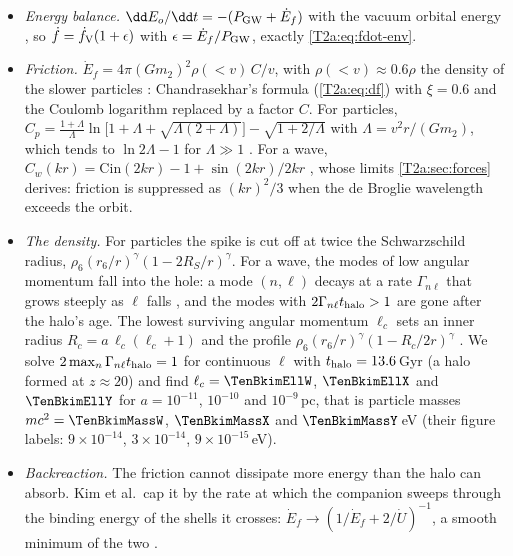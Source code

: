 \begin{itemize}[itemsep=2pt,leftmargin=1.2em]
  \item \emph{Energy balance.} $\dd E_o/\dd t=-(P_{\rm GW}+\dot E_f)$ with the vacuum orbital energy
        \cite[eq.~(36)]{Kim2023}, so $\dot f=\dot f_{\rm V}(1+\epsilon)$ with $\epsilon=\dot E_f/P_{\rm GW}$, exactly
        \cref{T2a:eq:fdot-env}.
  \item \emph{Friction.} $\dot E_f=4\pi(Gm_2)^2\rho(<v)\,C/v$, with $\rho(<v)\approx0.6\rho$ the density of the slower
        particles \cite[eq.~(39)]{Kim2023}: Chandrasekhar's formula (\cref{T2a:eq:df}) with $\xi=0.6$ and the Coulomb
        logarithm replaced by a factor $C$. For particles,
        $C_p=\frac{1+\Lambda}{\Lambda}\ln\big[1+\Lambda+\sqrt{\Lambda(2+\Lambda)}\big]-\sqrt{1+2/\Lambda}$ with
        $\Lambda=v^2r/(Gm_2)$, which tends to $\ln2\Lambda-1$ for $\Lambda\gg1$ \cite[eq.~(41)]{Kim2023}. For a wave,
        $C_w(kr)=\mathrm{Cin}(2kr)-1+\sin(2kr)/2kr$ \cite[eq.~(42)]{Kim2023}, whose limits \cref{T2a:sec:forces}
        derives: friction is suppressed as $(kr)^2/3$ when the de Broglie wavelength exceeds the orbit.
  \item \emph{The density.} For particles the spike is cut off at twice the Schwarzschild radius,
        $\rho_6(r_6/r)^\gamma(1-2R_S/r)^\gamma$. For a wave, the modes of low angular momentum fall into the hole: a mode
        $(n,\ell)$ decays at a rate $\Gamma_{n\ell}$ that grows steeply as $\ell$ falls \cite[eq.~(31)]{Kim2023}, and the
        modes with $2\Gamma_{n\ell}t_{\rm halo}>1$ are gone after the halo's age. The lowest surviving angular momentum
        $\ell_c$ sets an inner radius $R_c=a\,\ell_c(\ell_c+1)$ and the profile $\rho_6(r_6/r)^\gamma(1-R_c/2r)^\gamma$
        \cite[eq.~(40)]{Kim2023}. We solve $2\max_n\Gamma_{n\ell}t_{\rm halo}=1$ for continuous $\ell$ with
        $t_{\rm halo}=13.6$\,Gyr (a halo formed at $z\approx20$) and find $\ell_c=\TenBkimEllW$,
        $\TenBkimEllX$ and $\TenBkimEllY$ for $a=10^{-11}$, $10^{-10}$ and $10^{-9}$\,pc, that is particle masses
        $mc^2=\TenBkimMassW$, $\TenBkimMassX$ and $\TenBkimMassY$\,eV (their figure labels: $9\times10^{-14}$,
        $3\times10^{-14}$, $9\times10^{-15}$\,eV).
  \item \emph{Backreaction.} The friction cannot dissipate more energy than the halo can absorb. Kim et al.\ cap it by
        the rate at which the companion sweeps through the binding energy of the shells it crosses:
        $\dot E_f\to(1/\dot E_f+2/\dot U)^{-1}$, a smooth minimum of the two \cite[eq.~(43)]{Kim2023}.
\end{itemize}
